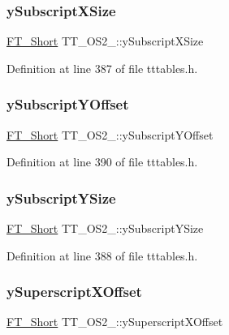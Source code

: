 \subsubsection{\texorpdfstring{ySubscriptXSize}{ySubscriptXSize}}
{\footnotesize\ttfamily \mbox{\hyperlink{fttypes_8h_aa7279be89046a2563cd3d4d6651fbdcf}{F\+T\+\_\+\+Short}} T\+T\+\_\+\+O\+S2\+\_\+\+::y\+Subscript\+X\+Size}



Definition at line 387 of file tttables.\+h.

\mbox{\label{struct_t_t___o_s2___a94902b1f33ded0ea4c0555d54a0750fa}} 
\subsubsection{\texorpdfstring{ySubscriptYOffset}{ySubscriptYOffset}}
{\footnotesize\ttfamily \mbox{\hyperlink{fttypes_8h_aa7279be89046a2563cd3d4d6651fbdcf}{F\+T\+\_\+\+Short}} T\+T\+\_\+\+O\+S2\+\_\+\+::y\+Subscript\+Y\+Offset}



Definition at line 390 of file tttables.\+h.

\mbox{\label{struct_t_t___o_s2___afb1b8ed1ea98badd4de58ff47b54c4c2}} 
\subsubsection{\texorpdfstring{ySubscriptYSize}{ySubscriptYSize}}
{\footnotesize\ttfamily \mbox{\hyperlink{fttypes_8h_aa7279be89046a2563cd3d4d6651fbdcf}{F\+T\+\_\+\+Short}} T\+T\+\_\+\+O\+S2\+\_\+\+::y\+Subscript\+Y\+Size}



Definition at line 388 of file tttables.\+h.

\mbox{\label{struct_t_t___o_s2___af06b18251aa7361e88484371599bcdbf}} 
\subsubsection{\texorpdfstring{ySuperscriptXOffset}{ySuperscriptXOffset}}
{\footnotesize\ttfamily \mbox{\hyperlink{fttypes_8h_aa7279be89046a2563cd3d4d6651fbdcf}{F\+T\+\_\+\+Short}} T\+T\+\_\+\+O\+S2\+\_\+\+::y\+Superscript\+X\+Offset}



